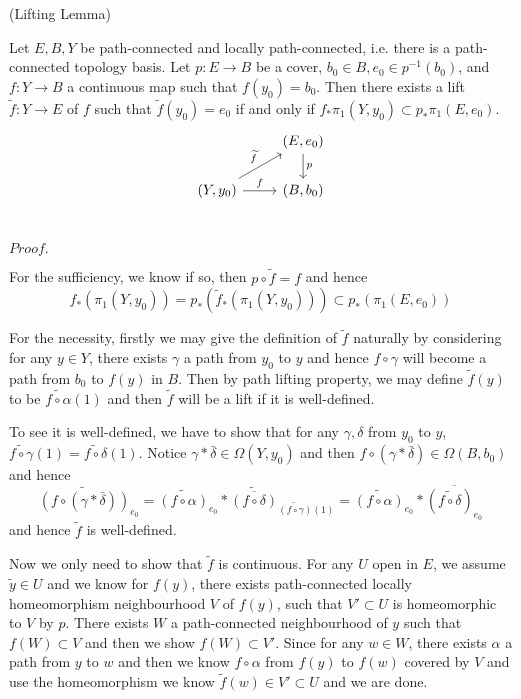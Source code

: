 \documentclass{article}
\newcommand{\Pf}[1]{$Proof.$\par}
\begin{document}
\begin{theorem}(Lifting Lemma)\par
    Let $E,B,Y$ be path-connected and locally path-connected, i.e. there is a path-connected topology basis. Let $p:E\to B$ be a cover, $b_0 \in B, e_0 \in p^{-1}(b_0)$, and $f:Y\to B$ a continuous map such that $f(y_0) = b_0$. Then there exists a lift $\widetilde{f}:Y\to E$ of $f$ such that $\widetilde{f}(y_0) = e_0$ if and only if $f_*\pi_1(Y,y_0) \subset p_*\pi_1(E,e_0)$.
    \[
    \begin{tikzcd}
                                        & (E,e_0)\arrow[d, "p"]\\
    (Y,y_0) \arrow[ru,"\widetilde{f}"] \arrow[r,"f"] & (B,b_0) \\
    \end{tikzcd}
    \]
\end{theorem}
\Pf\par
    For the sufficiency, we know if so, then $p\circ \widetilde{f} = f$ and hence \[f_*(\pi_1(Y,y_0)) = p_*(\widetilde{f}_*(\pi_1(Y,y_0))) \subset p_*(\pi_1(E,e_0))\]\par
    For the necessity, firstly we may give the definition of $\widetilde{f}$ naturally by considering for any $y\in Y$, there exists $\gamma$ a path from $y_0$ to $y$ and hence $f\circ \gamma$ will become a path from $b_0$ to $f(y)$ in $B$. Then by path lifting property, we may define $\widetilde{f}(y)$ to be $\widetilde{f\circ \alpha}(1)$ and then $\widetilde{f}$ will be a lift if it is well-defined.\par
    To see it is well-defined, we have to show that for any $\gamma,\delta$ from $y_0$ to $y$, $\widetilde{f\circ \gamma}(1) = \widetilde{f\circ \delta}(1)$. Notice $\gamma * \bar{\delta} \in \Omega(Y,y_0)$ and then $f \circ(\gamma*\bar{\delta}) \in \Omega(B,b_0)$ 
    and hence
    \[
    \widetilde{(f\circ (\gamma * \bar{\delta}))}_{e_0} = \widetilde{(f\circ \alpha)}_{e_0} * \widetilde{\overline{(f\circ \delta)}}_{\widetilde{(f\circ \gamma)}(1)} = \widetilde{(f\circ \alpha)}_{e_0} * \overline{(\widetilde{f\circ \delta})_{e_0}}
    \]
    and hence $\widetilde{f}$ is well-defined.\par
    Now we only need to show that $\widetilde{f}$ is continuous. For any $U$ open in $E$, we assume $\widetilde{y} \in U$ and we know for $f(y)$, there exists path-connected locally homeomorphism neighbourhood $V$ of $f(y)$, such that $V' \subset U$ is homeomorphic to $V$ by $p$. There exists $W$ a path-connected neighbourhood of $y$ such that $f(W)\subset V$ and then we show $f(W) \subset V'$. Since for any $w\in W$, there exists $\alpha$ a path from $y$ to $w$ and then we know $f\circ \alpha$ from $f(y)$ to $f(w)$ covered by $V$ and use the homeomorphism we know $\widetilde{f}(w) \in V' \subset U$ and we are done.
\end{document}
